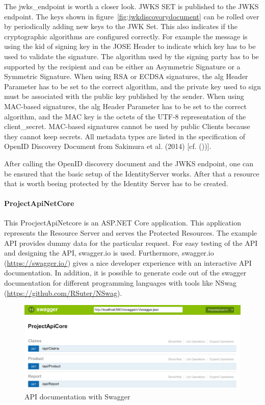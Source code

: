 The jwks\_endpoint is worth a closer look. JWKS SET is published to the JWKS endpoint. The keys shown in figure~\ref{fig:jwkdiscovorydocument} can be rolled over by periodically adding new keys to the JWK Set. This also indicates if the cryptographic algorithms are configured correctly. For example the message is using the kid of signing key in the JOSE Header to indicate which key has to be used to validate the signature. The algorithm used by the signing party has to be supported by the recipient and can be either an Asymmetric Signature or a Symmetric Signature. 
When using RSA or ECDSA signatures, the alg Header Parameter has to be set to the correct algorithm, and the private key used to sign must be associated with the public key published by the sender. When using MAC-based signatures, the alg Header Parameter has to be set to the correct algorithm, and the MAC key is the octets of the UTF-8 representation of the client\_secret. MAC-based signatures cannot be used by public Clients because they cannot keep secrets.  All metadata types are listed in the specification of OpenID Discovery Document from Sakimura et al. (2014) [cf. (\cite{Sakimura:OIDCD}))]. 

After calling the OpenID discovery document and the JWKS endpoint, one can be ensured that the basic setup of the IdentityServer works. After that a resource that is worth beeing protected by the Identity Server has to be created. 

\paragraph{ProjectApiNetCore}

This ProcjectApiNetcore is an ASP.NET Core application. This application represents the Resource Server and serves the Protected Resources. The example API provides dummy data for the particular request. For easy testing of the API and designing the API, swagger.io is used. Furthermore, swagger.io (\url{https://swagger.io/}) gives a nice developer experience with an interactive API documentation. In addition, it is possible to generate code out of the swagger documentation for different programming languages with tools like NSwag (\url{https://github.com/RSuter/NSwag}).

\begin{figure}[h]
	\centering
	\includegraphics[width=0.7\linewidth]{images/apis}
	\caption{API documentation with Swagger}
	\label{fig:apis}
\end{figure}

